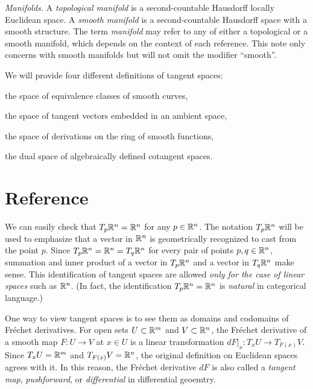 \documentclass{../note}
\begin{document}
\begin{prb}\emph{Manifolds.}
A \emph{topological manifold} is a second-countable Hausdorff locally Euclidean space.
A \emph{smooth manifold} is a second-countable Hausdorff space with a smooth structure.
The term \emph{manifold} may refer to any of either a topological or a smooth manifold, which depends on the context of each reference.
This note only concerns with smooth manifolds but will not omit the modifier ``smooth''.
\begin{parts}
\item
\end{parts}
\end{prb}





We will provide four different definitions of tangent spaces:
\begin{parts}
\item the space of equivalence classes of smooth curves,
\item the space of tangent vectors embedded in an ambient space,
\item the space of derivations on the ring of smooth functions,
\item the dual space of algebraically defined cotangent spaces.
\end{parts}




\chapter*{Reference}

\begin{rmk}
We can easily check that $T_p\mathbb{R}^n=\mathbb{R}^n$ for any $p\in\mathbb{R}^n$.
The notation $T_p\mathbb{R}^n$ will be used to emphasize that a vector in $\mathbb{R}^n$ is geometrically recognized to cast from the point $p$.
Since $T_p\mathbb{R}^n=\mathbb{R}^n=T_q\mathbb{R}^n$ for every pair of points $p,q\in\mathbb{R}^n$, summation and inner product of a vector in $T_p\mathbb{R}^n$ and a vector in $T_q\mathbb{R}^n$ make sense.
This identification of tangent spaces are allowed \emph{only for the case of linear spaces} such as $\mathbb{R}^n$.
(In fact, the identification $T_p\mathbb{R}^n=\mathbb{R}^n$ is \emph{natural} in categorical language.)
\end{rmk}
\begin{rmk}
One way to view tangent spaces is to see them as domains and codomains of Fr\'echet derivatives.
For open sets $U\subset\mathbb{R}^m$ and $V\subset\mathbb{R}^n$, the Fr\'echet derivative of a smooth map $F:U\to V$ at $x\in U$ is a linear transformation $dF|_x:T_xU\to T_{F(x)}V$.
Since $T_xU=\mathbb{R}^m$ and $T_{F(x)}V=\mathbb{R}^n$, the original definition on Euclidean spaces agrees with it.
In this reason, the Fr\'echet derivative $dF$ is also called a \emph{tangent map}, \emph{pushforward}, or \emph{differential} in differential geoemtry.
\end{rmk}
\end{document}
